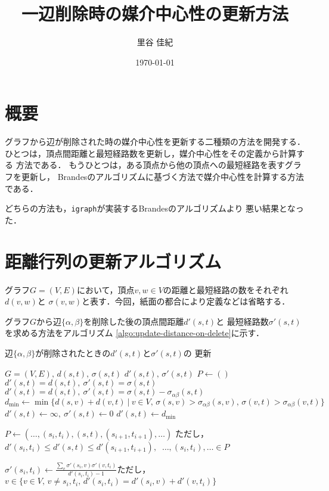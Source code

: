 \documentclass{jarticle}
\title{一辺削除時の媒介中心性の更新方法}
\author{里谷 佳紀}
\date{\today}
\begin{document}
\maketitle

\section{概要}
グラフから辺が削除された時の媒介中心性を更新する二種類の方法を開発する．
ひとつは，頂点間距離と最短経路数を更新し，媒介中心性をその定義から計算する
方法である．
もうひとつは，ある頂点から他の頂点への最短経路を表すグラフを更新し，
Brandesのアルゴリズムに基づく方法で媒介中心性を計算する方法である．

どちらの方法も，\verb|igraph|が実装するBrandesのアルゴリズムより
悪い結果となった．

\section{距離行列の更新アルゴリズム}
グラフ$G=(V,E)$において，頂点$v,w\in V$の距離と最短経路の数をそれぞれ$d(v,w)$と
$\sigma(v,w)$と表す．今回，紙面の都合により定義などは省略する．

グラフ$G$から辺$\{\alpha,\beta\}$を削除した後の頂点間距離$d'(s,t)$と
最短経路数$\sigma'(s,t)$を求める方法をアルゴリズム
\ref{algo:update-distance-on-delete}に示す．

\begin{algorithm}[H]
  \caption{辺$\{\alpha,\beta\}$が削除されたときの$d'(s,t)$と$\sigma'(s,t)$の
    更新}\label{algo:update-distance-on-delete}
  \begin{algorithmic}[1]
    \Require $G=(V,E),\,d(s,t),\,\sigma(s,t)$
    \Ensure $d'(s,t),\,\sigma'(s,t)$
    \State $P\gets()$
    \State $d'(s,t)=d(s,t),\:\sigma'(s,t)=\sigma(s,t)$
    \State $d'(s,t)=d(s,t),\:\sigma'(s,t)=\sigma(s,t)-\sigma_{\alpha\beta}(s,t)$
    \State $d_{\min}\gets \min\{d(s,v)+d(v,t)\:|\:v\in V,\,\sigma(s,v)>\sigma_{\alpha\beta}(s,v),\,\sigma(v,t)>\sigma_{\alpha\beta}(v,t)\}$
    \State $d'(s,t)\gets\infty,\:\sigma'(s,t)\gets0$
    \Else
    \State $d'(s,t)\gets d_{\min}$
    \State \parbox[t]{\linewidth}{
      $P\gets(\ldots,(s_i,t_i),(s,t),(s_{i+1},t_{i+1}),\ldots)$
      ただし，$d'(s_i,t_i)\leq d'(s,t)\leq d'(s_{i+1},t_{i+1}),\:$
      $\ldots,(s_i,t_i),\ldots\in P$
    }
    \EndIf
    \EndIf
    \EndFor
    \State $\sigma'(s_i,t_i)\gets\frac{\sum_v\sigma'(s_i,v)\sigma'(v,t_i)}{d'(s_i,t_i)-1}$ただし，$v\in\{v\in V,\,v\neq s_i,t_i,\,d'(s_i,t_i)=d'(s_i,v)+d'(v,t_i)\}$
    \EndFor
  \end{algorithmic}
\end{algorithm}
\end{document}
